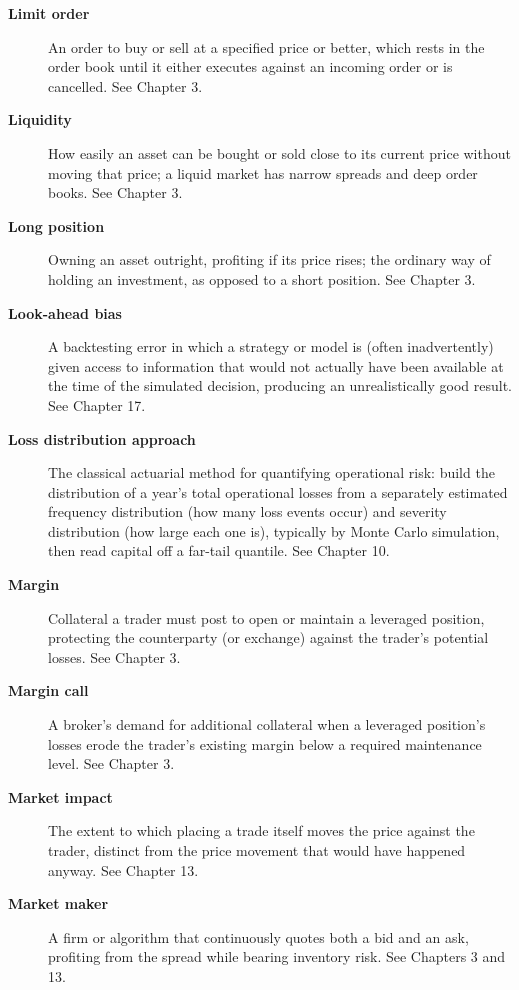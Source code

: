 \documentclass[../ai_in_finance]{subfiles}
\begin{document}
\begin{description}
\item[\textbf{Limit order}] An order to buy or sell at a specified price or better, which rests in the order book until it either executes against an incoming order or is cancelled. See Chapter 3.

\item[\textbf{Liquidity}] How easily an asset can be bought or sold close to its current price without moving that price; a liquid market has narrow spreads and deep order books. See Chapter 3.

\item[\textbf{Long position}] Owning an asset outright, profiting if its price rises; the ordinary way of holding an investment, as opposed to a short position. See Chapter 3.

\item[\textbf{Look-ahead bias}] A backtesting error in which a strategy or model is (often inadvertently) given access to information that would not actually have been available at the time of the simulated decision, producing an unrealistically good result. See Chapter 17.

\item[\textbf{Loss distribution approach}] The classical actuarial method for quantifying operational risk: build the distribution of a year's total operational losses from a separately estimated frequency distribution (how many loss events occur) and severity distribution (how large each one is), typically by Monte Carlo simulation, then read capital off a far-tail quantile. See Chapter 10.

\item[\textbf{Margin}] Collateral a trader must post to open or maintain a leveraged position, protecting the counterparty (or exchange) against the trader's potential losses. See Chapter 3.

\item[\textbf{Margin call}] A broker's demand for additional collateral when a leveraged position's losses erode the trader's existing margin below a required maintenance level. See Chapter 3.

\item[\textbf{Market impact}] The extent to which placing a trade itself moves the price against the trader, distinct from the price movement that would have happened anyway. See Chapter 13.

\item[\textbf{Market maker}] A firm or algorithm that continuously quotes both a bid and an ask, profiting from the spread while bearing inventory risk. See Chapters 3 and 13.


\end{description}
\end{document}
